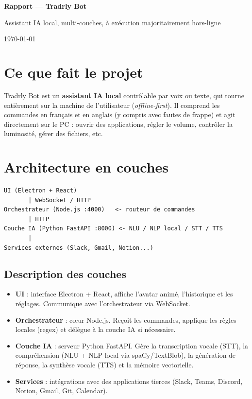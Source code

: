 \documentclass[12pt,a4paper]{article}
\begin{document}
\begin{titlepage}
  \centering
  \vspace*{3cm}
  {\Huge\bfseries\color{primary} Rapport — Tradrly Bot\par}
  \vspace{1cm}
  {\large Assistant IA local, multi-couches, à exécution majoritairement hors-ligne\par}
  \vspace{2cm}
  {\large\today\par}
\end{titlepage}

\section{Ce que fait le projet}

Tradrly Bot est un \textbf{assistant IA local} contrôlable par voix ou texte,
qui tourne entièrement sur la machine de l'utilisateur (\emph{offline-first}).
Il comprend les commandes en français et en anglais (y compris avec fautes de frappe)
et agit directement sur le PC : ouvrir des applications, régler le volume,
contrôler la luminosité, gérer des fichiers, etc.

\section{Architecture en couches}

\begin{lstlisting}
UI (Electron + React)
       | WebSocket / HTTP
Orchestrateur (Node.js :4000)   <- routeur de commandes
       | HTTP
Couche IA (Python FastAPI :8000) <- NLU / NLP local / STT / TTS
       |
Services externes (Slack, Gmail, Notion...)
\end{lstlisting}

\subsection*{Description des couches}

\begin{itemize}
  \item \textbf{UI} : interface Electron + React, affiche l'avatar animé, l'historique et les réglages. Communique avec l'orchestrateur via WebSocket.
  \item \textbf{Orchestrateur} : cœur Node.js. Reçoit les commandes, applique les règles locales (regex) et délègue à la couche IA si nécessaire.
  \item \textbf{Couche IA} : serveur Python FastAPI. Gère la transcription vocale (STT), la compréhension (NLU + NLP local via spaCy/TextBlob), la génération de réponse, la synthèse vocale (TTS) et la mémoire vectorielle.
  \item \textbf{Services} : intégrations avec des applications tierces (Slack, Teams, Discord, Notion, Gmail, Git, Calendar).
\end{itemize}
\end{document}
